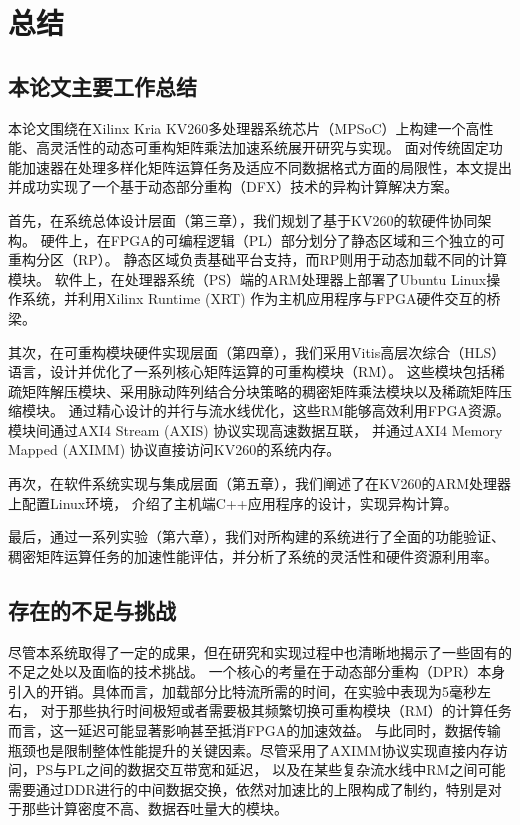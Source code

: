 \chapter{总结}

\section{本论文主要工作总结}

本论文围绕在Xilinx Kria KV260多处理器系统芯片（MPSoC）上构建一个高性能、高灵活性的动态可重构矩阵乘法加速系统展开研究与实现。
面对传统固定功能加速器在处理多样化矩阵运算任务及适应不同数据格式方面的局限性，本文提出并成功实现了一个基于动态部分重构（DFX）技术的异构计算解决方案。

首先，在系统总体设计层面（第三章），我们规划了基于KV260的软硬件协同架构。
硬件上，在FPGA的可编程逻辑（PL）部分划分了静态区域和三个独立的可重构分区（RP）。
静态区域负责基础平台支持，而RP则用于动态加载不同的计算模块。
软件上，在处理器系统（PS）端的ARM处理器上部署了Ubuntu Linux操作系统，并利用Xilinx Runtime (XRT) 作为主机应用程序与FPGA硬件交互的桥梁。

其次，在可重构模块硬件实现层面（第四章），我们采用Vitis高层次综合（HLS）语言，设计并优化了一系列核心矩阵运算的可重构模块（RM）。
这些模块包括稀疏矩阵解压模块、采用脉动阵列结合分块策略的稠密矩阵乘法模块以及稀疏矩阵压缩模块。
通过精心设计的并行与流水线优化，这些RM能够高效利用FPGA资源。模块间通过AXI4 Stream (AXIS) 协议实现高速数据互联，
并通过AXI4 Memory Mapped (AXIMM) 协议直接访问KV260的系统内存。

再次，在软件系统实现与集成层面（第五章），我们阐述了在KV260的ARM处理器上配置Linux环境，
介绍了主机端C++应用程序的设计，实现异构计算。

最后，通过一系列实验（第六章），我们对所构建的系统进行了全面的功能验证、
稠密矩阵运算任务的加速性能评估，并分析了系统的灵活性和硬件资源利用率。

\section{存在的不足与挑战}

尽管本系统取得了一定的成果，但在研究和实现过程中也清晰地揭示了一些固有的不足之处以及面临的技术挑战。
一个核心的考量在于动态部分重构（DPR）本身引入的开销。具体而言，加载部分比特流所需的时间，在实验中表现为5毫秒左右，
对于那些执行时间极短或者需要极其频繁切换可重构模块（RM）的计算任务而言，这一延迟可能显著影响甚至抵消FPGA的加速效益。
与此同时，数据传输瓶颈也是限制整体性能提升的关键因素。尽管采用了AXIMM协议实现直接内存访问，PS与PL之间的数据交互带宽和延迟，
以及在某些复杂流水线中RM之间可能需要通过DDR进行的中间数据交换，依然对加速比的上限构成了制约，特别是对于那些计算密度不高、数据吞吐量大的模块。

